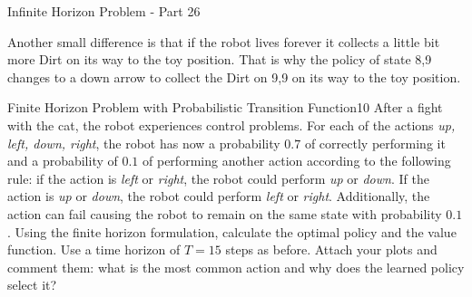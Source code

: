 \begin{questions}
\begin{question}{Infinite Horizon Problem - Part 2}{6}
\begin{answer}
Another small difference is that if the robot lives forever it collects a little bit more Dirt on its way to the toy position. That is why the policy of state 8,9 changes to a down arrow to collect the Dirt on 9,9 on its way to the toy position. 
\end{answer}


\end{question}



\begin{question}{Finite Horizon Problem with Probabilistic Transition Function}{10}
After a fight with the cat, the robot experiences control problems. 
For each of the actions \textit{up, left, down, right}, the robot has now a probability $0.7$ of correctly performing it and a probability of $0.1$ of performing another action according to the following rule: if the action is \textit{left} or \textit{right}, the robot could perform \textit{up} or \textit{down}. If the action is \textit{up} or \textit{down}, the robot could perform \textit{left} or \textit{right}.
Additionally, the action can fail causing the robot to remain on the same state with probability $0.1$.
Using the finite horizon formulation, calculate the optimal policy and the value function. Use a time horizon of $T=15$ steps as before. Attach your plots and comment them: what is the most common action and why does the learned policy select it?


\end{question}
\end{questions}
